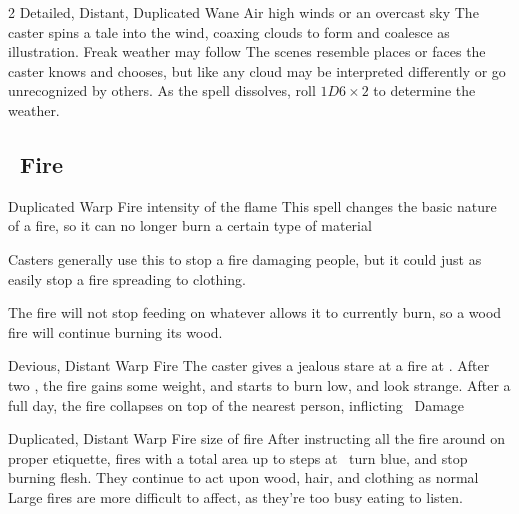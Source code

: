 \begin{multicols}{2}
  {Detailed, Distant, Duplicated}%
  {Wane}%
  {Air}%
  {high winds or an overcast sky}%
  {The caster spins a tale into the wind, coaxing clouds to form and coalesce as illustration.
  Freak weather may follow}%
  {
  The scenes resemble places or faces the caster knows and chooses, but like any cloud may be interpreted differently or go unrecognized by others.
  As the \gls{spell} dissolves, roll $1D6 \times 2$ to determine the weather.%
}

\subsection[Fire]{~Fire}
\label{fireSpells}



  {Duplicated}%
  {Warp}%
  {Fire}%
  {intensity of the flame}%
  {This spell changes the basic nature of a fire, so it can no longer burn a certain type of material}%
  {Casters generally use this to stop a fire damaging people, but it could just as easily stop a fire spreading to clothing.

    The fire will not stop feeding on whatever allows it to currently burn, so a wood fire will continue burning its wood.}



  {Devious, Distant}%
  {Warp}%
  {Fire}%
  {}%
  {The caster gives a jealous stare at a fire at \spellRange.
  After two , the fire gains some weight, and starts to burn low, and look strange.
  After a full day, the fire collapses on top of the nearest person, inflicting \showDam~Damage}%
  {}

  {Duplicated, Distant}%
  {Warp}%
  {Fire}%
  {size of fire}%
  {After instructing all the fire around on proper etiquette, fires with a total area up to  \glspl{step} at \spellRange\ turn blue, and stop burning flesh.
  They continue to act upon wood, hair, and clothing as normal}%
  {Large fires are more difficult to affect, as they're too busy eating to listen.}


\end{multicols}
